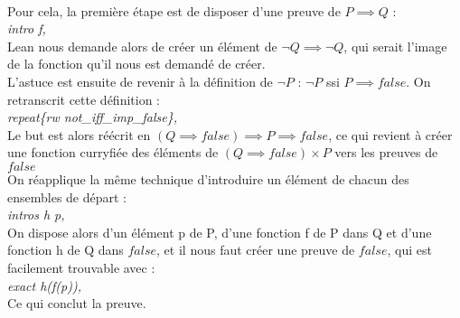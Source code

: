 \documentclass[french,frenchkw]{article}
\begin{document}
\\
Pour cela, la première étape est de disposer d'une preuve de $P \implies Q$ :\\
\textit{intro f,}\\
Lean nous demande alors de créer un élément de $\lnot Q \implies \lnot Q$, qui serait l'image de la fonction qu'il nous est demandé de créer.\\
L'astuce est ensuite de revenir à la définition de $\lnot P$ : $\lnot P$ ssi $P \implies false$. On retranscrit cette définition : \\
\textit{repeat\{rw not\_iff\_imp\_false\},} \\
Le but est alors réécrit en $(Q \implies false) \implies P \implies false$, ce qui revient à créer une fonction curryfiée des éléments de $(Q \implies false) \times P$ vers les preuves de $false$\\
On réapplique la même technique d'introduire un élément de chacun des ensembles de départ : \\
\textit{intros h p,}\\
On dispose alors d'un élément p de P, d'une fonction f de P dans Q et d'une fonction h de Q dans $false$, et il nous faut créer une preuve de $false$, qui est facilement trouvable avec : \\
\textit{exact h(f(p)),}\\
Ce qui conclut la preuve.
\end{document}
